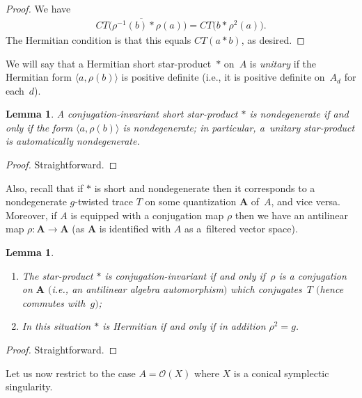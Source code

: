 \documentclass[pdftex]{sigma}
\numberwithin{equation}{section}
\newtheorem{Lemma}[Theorem]{Lemma}
\begin{document}
\begin{proof} We have
\begin{gather*}
\overline{CT\big(\rho^{-1}(b)*\rho(a)\big)}=CT\big(b*\rho^2(a)\big).
\end{gather*}
The Hermitian condition is that this equals $CT(a*b)$, as desired.
\end{proof}

\begin{Definition}We will say that a Hermitian short star-product~$*$ on~$A$ is {\it unitary} if the Hermitian form $\langle a,\rho(b)\rangle$ is positive definite (i.e., it is positive definite on~$A_d$ for each~$d$).
\end{Definition}

\begin{Lemma}\label{lh1} A conjugation-invariant short star-product $*$ is nondegenerate if and only if
the form $\langle a,\rho(b)\rangle$ is nondegenerate; in particular, a~unitary star-product is automatically nondegenerate.
\end{Lemma}

\begin{proof} Straightforward.
\end{proof}

Also, recall that if $*$ is short and nondegenerate then it corresponds to a nondegenerate $g$-twisted trace $T$ on some quantization ${\mathbf A}$ of~$A$, and vice versa. Moreover, if $A$ is equipped with a conjugation map $\rho$ then we have an antilinear map $\rho\colon {\mathbf A}\to {\mathbf A}$ (as ${\mathbf A}$ is identified with $A$ as a~filtered vector space).

\begin{Lemma}\label{lh2}\quad
\begin{enumerate}\itemsep=0pt
\item[$(i)$] The star-product $*$ is conjugation-invariant if and only if~$\rho$ is a conjugation on ${\mathbf A}$ $($i.e., an antilinear algebra automorphism$)$ which conjugates~$T$ $($hence commutes with~$g)$;
\item[$(ii)$] In this situation $*$ is Hermitian if and only if in addition $\rho^2=g$.
\end{enumerate}
\end{Lemma}

\begin{proof} Straightforward.
\end{proof}

Let us now restrict to the case $A=\mathcal{O}(X)$ where $X$ is a conical symplectic singularity.
\end{document}

